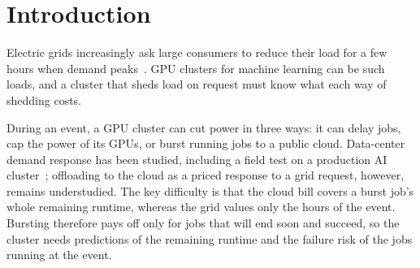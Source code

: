 \section{Introduction}
\label{sec:intro}
Electric grids increasingly ask large consumers to reduce their load for a few hours when demand peaks~\cite{liu13}. GPU clusters for machine learning can be such loads, and a cluster that sheds load on request must know what each way of shedding costs.

During an event, a GPU cluster can cut power in three ways: it can delay jobs, cap the power of its GPUs, or burst running jobs to a public cloud. Data-center demand response has been studied, including a field test on a production AI cluster~\cite{liu13,zhou24,zhou24flex,colangelo26}; offloading to the cloud as a priced response to a grid request, however, remains understudied. The key difficulty is that the cloud bill covers a burst job's whole remaining runtime, whereas the grid values only the hours of the event. Bursting therefore pays off only for jobs that will end soon and succeed, so the cluster needs predictions of the remaining runtime and the failure risk of the jobs running at the event.

